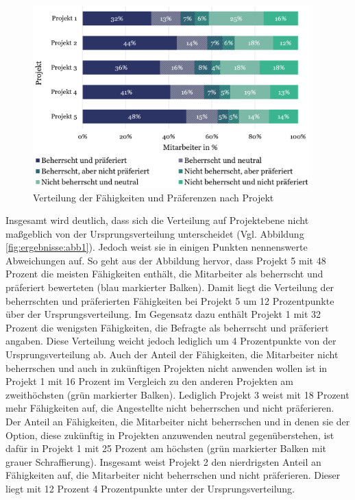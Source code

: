 \begin{figure}
    \centering
	\includegraphics[width=0.95\textwidth]{gfx/verteilung-f-p-nach-projekt.png}
	\caption[Verteilung der Fähigkeiten und Präferenzen nach Projekt]{Verteilung der Fähigkeiten und Präferenzen nach Projekt}
	\label{fig:ergebnisse:abb2}
\end{figure}

Insgesamt wird deutlich, dass sich die Verteilung auf Projektebene nicht maßgeblich von der Ursprungsverteilung unterscheidet (Vgl. Abbildung \ref{fig:ergebnisse:abb1}).
Jedoch weist sie in einigen Punkten nennenswerte Abweichungen auf.
So geht aus der Abbildung hervor, dass Projekt 5 mit 48 Prozent die meisten Fähigkeiten enthält, die Mitarbeiter als beherrscht und präferiert bewerteten (blau markierter Balken).
Damit liegt die Verteilung der beherrschten und präferierten Fähigkeiten bei Projekt 5 um 12 Prozentpunkte über der Ursprungsverteilung.
Im Gegensatz dazu enthält Projekt 1 mit 32 Prozent die wenigsten Fähigkeiten, die Befragte als beherrscht und präferiert angaben.
Diese Verteilung weicht jedoch lediglich um 4 Prozentpunkte von der Ursprungsverteilung ab.
Auch der Anteil der Fähigkeiten, die Mitarbeiter nicht beherrschen und auch in zukünftigen Projekten nicht anwenden wollen ist in Projekt 1 mit 16 Prozent im Vergleich zu den anderen Projekten am zweithöchsten (grün markierter Balken).
Lediglich Projekt 3 weist mit 18 Prozent mehr Fähigkeiten auf, die Angestellte nicht beherrschen und nicht präferieren.
Der Anteil an Fähigkeiten, die Mitarbeiter nicht beherrschen und in denen sie der Option, diese zukünftig in Projekten anzuwenden neutral gegenüberstehen, ist dafür in Projekt 1 mit 25 Prozent am höchsten (grün markierter Balken mit grauer Schraffierung).
Insgesamt weist Projekt 2 den nierdrigsten Anteil an Fähigkeiten auf, die Mitarbeiter nicht beherrschen und nicht präferieren.
Dieser liegt mit 12 Prozent 4 Prozentpunkte unter der Ursprungsverteilung.

